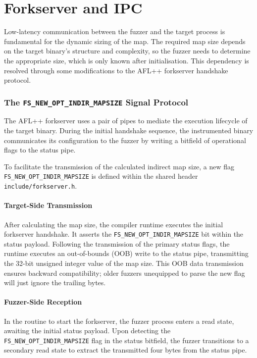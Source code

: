 \section{Forkserver and IPC}

Low-latency communication between the fuzzer and the target process is fundamental for the dynamic sizing of the map. The required map size depends on the target binary's structure and complexity, so the fuzzer needs to determine the appropriate size, which is only known after initialisation. This dependency is resolved through some modifications to the AFL++ forkserver handshake protocol.

\subsubsection{The \texttt{FS\_NEW\_OPT\_INDIR\_MAPSIZE} Signal Protocol}
\label{subsub:signalprot}

The AFL++ forkserver uses a pair of pipes to mediate the execution lifecycle of the target binary. During the initial handshake sequence, the instrumented binary communicates its configuration to the fuzzer by writing a bitfield of operational flags to the status pipe.

To facilitate the transmission of the calculated indirect map size, a new flag \texttt{FS\_NEW\_OPT\_INDIR\_MAPSIZE} is defined within the shared header \texttt{include/forkserver.h}.

\paragraph{Target-Side Transmission} After calculating the map size, the compiler runtime executes the initial forkserver handshake. It asserts the \texttt{FS\_NEW\_OPT\_INDIR\_MAPSIZE} bit within the status payload. Following the transmission of the primary status flags, the runtime executes an out-of-bounds (OOB) write to the status pipe, transmitting the 32-bit unsigned integer value of the map size. This OOB data transmission ensures backward compatibility; older fuzzers unequipped to parse the new flag will just ignore the trailing bytes.

\paragraph{Fuzzer-Side Reception} In the routine to start the forkserver, the fuzzer process enters a read state, awaiting the initial status payload. Upon detecting the \texttt{FS\_NEW\_OPT\_INDIR\_MAPSIZE} flag in the status bitfield, the fuzzer transitions to a secondary read state to extract the transmitted four bytes from the status pipe.


